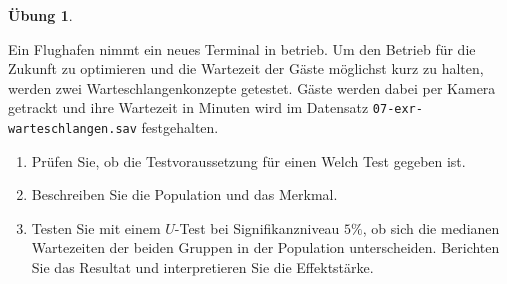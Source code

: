 \documentclass[
]{book}
\providecommand{\tightlist}{%
  \setlength{\itemsep}{0pt}\setlength{\parskip}{0pt}}
\theoremstyle{definition}
\theoremstyle{definition}
\theoremstyle{definition}
\newtheorem{exercise}{Übung}[chapter]
\theoremstyle{definition}
\theoremstyle{remark}
\begin{document}
\begin{exercise}
\protect\hypertarget{exr:warteschlangen}{}\label{exr:warteschlangen}\leavevmode

Ein Flughafen nimmt ein neues Terminal in betrieb. Um den Betrieb für
die Zukunft zu optimieren und die Wartezeit der Gäste möglichst kurz zu
halten, werden zwei Warteschlangenkonzepte getestet. Gäste werden dabei
per Kamera getrackt und ihre Wartezeit in Minuten wird im Datensatz
\texttt{07-exr-warteschlangen.sav} festgehalten.

\begin{enumerate}
\def\labelenumi{\alph{enumi})}
\tightlist
\item
  Prüfen Sie, ob die Testvoraussetzung für einen Welch Test gegeben
  ist.
\item
  Beschreiben Sie die Population und das Merkmal.
\item
  Testen Sie mit einem \(U\)-Test bei Signifikanzniveau \(5\%\), ob sich
  die medianen Wartezeiten der beiden Gruppen in der Population
  unterscheiden. Berichten Sie das Resultat und interpretieren Sie die
  Effektstärke.
\end{enumerate}

\end{exercise}
\end{document}
